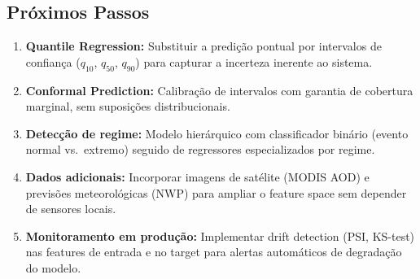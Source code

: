 \documentclass[12pt, a4paper]{article}
\begin{document}
\subsection{Próximos Passos}

\begin{enumerate}
    \item \textbf{Quantile Regression:} Substituir a predição pontual
          por intervalos de confiança ($q_{10}$, $q_{50}$, $q_{90}$)
          para capturar a incerteza inerente ao sistema.

    \item \textbf{Conformal Prediction:} Calibração de intervalos com
          garantia de cobertura marginal, sem suposições
          distribucionais.

    \item \textbf{Detecção de regime:} Modelo hierárquico com
          classificador binário (evento normal vs.\ extremo) seguido
          de regressores especializados por regime.

    \item \textbf{Dados adicionais:} Incorporar imagens de satélite
          (MODIS AOD) e previsões meteorológicas (NWP) para ampliar o
          feature space sem depender de sensores locais.

    \item \textbf{Monitoramento em produção:} Implementar drift
          detection (PSI, KS-test) nas features de entrada e no
          target para alertas automáticos de degradação do modelo.
\end{enumerate}
\end{document}
